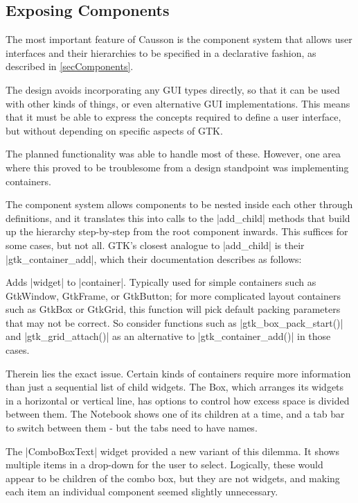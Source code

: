 \documentclass[11pt]{report}
\begin{document}
\subsection{Exposing Components} \label{secGtkCompShite}

The most important feature of Causson is the component system that allows user interfaces and their hierarchies to be specified in a declarative fashion, as described in \cref{secComponents}.

The design avoids incorporating any GUI types directly, so that it can be used with other kinds of things, or even alternative GUI implementations. This means that it must be able to express the concepts required to define a user interface, but without depending on specific aspects of GTK.

The planned functionality was able to handle most of these. However, one area where this proved to be troublesome from a design standpoint was implementing containers.

The component system allows components to be nested inside each other through definitions, and it translates this into calls to the |add_child| methods that build up the hierarchy step-by-step from the root component inwards. This suffices for some cases, but not all. GTK's closest analogue to |add_child| is their |gtk_container_add|, which their documentation describes as follows:

\vspace{-0.4cm}
\begin{displayquote}
Adds |widget| to |container|. Typically used for simple containers such as GtkWindow, GtkFrame, or GtkButton; for more complicated layout containers such as GtkBox or GtkGrid, this function will pick default packing parameters that may not be correct. So consider functions such as |gtk_box_pack_start()| and |gtk_grid_attach()| as an alternative to |gtk_container_add()| in those cases.\cite{GtkContainer}
\end{displayquote}

\vspace{-0.4cm} %
Therein lies the exact issue. Certain kinds of containers require more information than just a sequential list of child widgets. The Box, which arranges its widgets in a horizontal or vertical line, has options to control how excess space is divided between them. The Notebook shows one of its children at a time, and a tab bar to switch between them - but the tabs need to have names.

The |ComboBoxText| widget provided a new variant of this dilemma. It shows multiple items in a drop-down for the user to select. Logically, these would appear to be children of the combo box, but they are not widgets, and making each item an individual component seemed slightly unnecessary.
\end{document}
